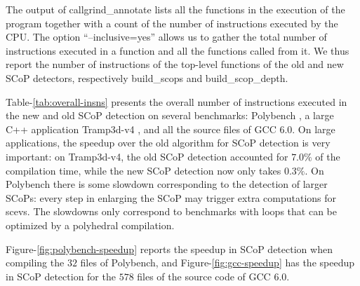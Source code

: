 \documentclass{sig-alternate}
\begin{document}
The output of callgrind\_annotate lists all the functions in the execution of
the program together with a count of the number of instructions executed by the
CPU.  The option ``--inclusive=yes'' allows us to gather the total number of
instructions executed in a function and all the functions called from it.  We
thus report the number of instructions of the top-level functions of the old and
new SCoP detectors, respectively build\_scops and build\_scop\_depth.

Table-\ref{tab:overall-insns} presents the overall number of instructions
executed in the new and old SCoP detection on several benchmarks: Polybench
\cite{polybench}, a large C++ application Tramp3d-v4 \cite{richi}, and all the
source files of GCC 6.0.  On large applications, the speedup over the old
algorithm for SCoP detection is very important: on Tramp3d-v4, the old SCoP
detection accounted for $7.0\%$ of the compilation time, while the new SCoP
detection now only takes $0.3\%$.  On Polybench there is some slowdown
corresponding to the detection of larger SCoPs: every step in enlarging the SCoP
may trigger extra computations for scevs.  The slowdowns only correspond to
benchmarks with loops that can be optimized by a polyhedral compilation.

Figure-\ref{fig:polybench-speedup} reports the speedup in SCoP detection when
compiling the $32$ files of Polybench, and Figure-\ref{fig:gcc-speedup} has the
speedup in SCoP detection for the $578$ files of the source code of GCC 6.0.

\begin{table}[h!]
  \begin{center}
  \end{center}
  \caption{Overall number of instructions spent in SCoP detection: columns New
    and Old report the number of instructions executed by the old and new SCoP
    detectors of GCC; Speedup reports the speedup between the Old and New; Main
    reports the cumulative number of instructions executed by the main function
    of the GCC cc1plus compiler; Old \% and New \% report the overall
    compilation time overhead of the old and new SCoP detection.}
  \label{tab:overall-insns}
\end{table}
\end{document}
